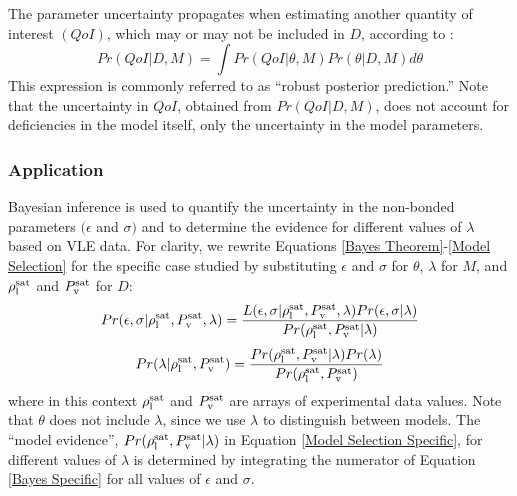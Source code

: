 \documentclass[preprint,letterpaper,floatfix,citeautoscript,aip,jcp]{revtex4-1}
\begin{document}
The parameter uncertainty propagates when estimating another quantity of interest $(QoI)$, which may or may not be included in $D$, according to \cite{Kulakova2017}:
\begin{equation} \label{Posterior Prediction}
Pr(QoI|D,M) = \int Pr(QoI|\theta,M) Pr(\theta|D,M) d\theta
\end{equation}
This expression is commonly referred to as ``robust posterior prediction.'' Note that the uncertainty in $QoI$, obtained from $Pr(QoI|D,M)$, does not account for deficiencies in the model itself, only the uncertainty in the model parameters.

\subsubsection{Application}

Bayesian inference is used to quantify the uncertainty in the non-bonded parameters $(\epsilon$ and $\sigma)$ and to determine the evidence for different values of $\lambda$ based on VLE data. 
For clarity, we rewrite Equations \ref{Bayes Theorem}-\ref{Model Selection} for the specific case studied by substituting $\epsilon$ and $\sigma$ for $\theta$, $\lambda$ for $M$, and $\rho_{\rm l}^{\rm sat}$ and $P_{\rm v}^{\rm sat}$ for $D$:
\begin{equation} \label{Bayes Specific}
Pr(\epsilon,\sigma|\rho_{\rm l}^{\rm sat},P_{\rm v}^{\rm sat},\lambda) = \frac{L(\epsilon,\sigma|\rho_{\rm l}^{\rm sat},P_{\rm v}^{\rm sat},\lambda)Pr(\epsilon,\sigma|\lambda)}{Pr(\rho_{\rm l}^{\rm sat},P_{\rm v}^{\rm sat}|\lambda)}
\end{equation}
\begin{equation} \label{Model Selection Specific}
Pr(\lambda|\rho_{\rm l}^{\rm sat},P_{\rm v}^{\rm sat}) = \frac{Pr(\rho_{\rm l}^{\rm sat},P_{\rm v}^{\rm sat}|\lambda)Pr(\lambda)}{Pr(\rho_{\rm l}^{\rm sat},P_{\rm v}^{\rm sat})}
\end{equation}
where in this context $\rho_{\rm l}^{\rm sat}$ and $P_{\rm v}^{\rm sat}$ are arrays of experimental data values. Note that $\theta$ does not include $\lambda$, since we use $\lambda$ to distinguish between models. The ``model evidence'', $Pr(\rho_{\rm l}^{\rm sat},P_{\rm v}^{\rm sat}|\lambda)$ in Equation \ref{Model Selection Specific}, for different values of $\lambda$ is determined by integrating the numerator of Equation \ref{Bayes Specific} for all values of $\epsilon$ and $\sigma$. 
\end{document}
